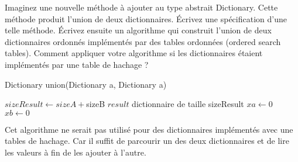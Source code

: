 Imaginez une nouvelle méthode à ajouter au type abstrait Dictionary. Cette méthode produit l’union de deux dictionnaires. Écrivez une spécification d’une telle méthode. Écrivez ensuite un algorithme qui construit l’union de deux dictionnaires ordonnés implémentés par des tables ordonnées (ordered search tables). Comment appliquer votre algorithme si les dictionnaires étaient implémentés par une table de hachage ?

\begin{algorithm}
Dictionary union(Dictionary a, Dictionary a)
\end{algorithm}

\begin{algorithm}
\BlankLine
$sizeResult \longleftarrow sizeA + $sizeB\;
$result$ dictionnaire de taille sizeResult\;
$xa \gets 0$\;
$xb \gets 0$\;
\end{algorithm}

Cet algorithme ne serait pas utilisé pour des dictionnaires implémentés avec une tables de hachage. Car il suffit de parcourir un des deux dictionnaires et de lire les valeurs à fin de les ajouter à l'autre.

